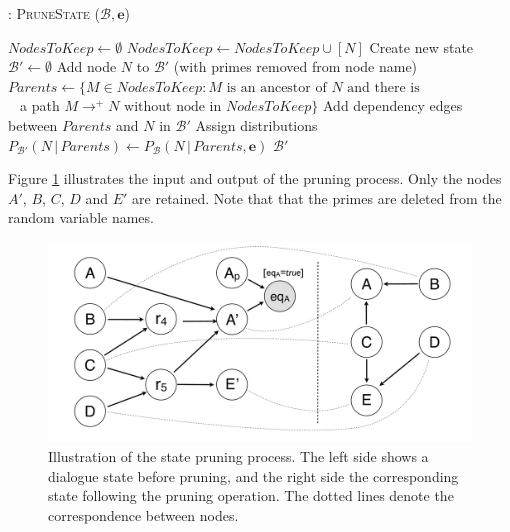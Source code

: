 \begin{algorithm}[h]
\caption{: \textsc{PruneState} ($\mathcal{B}, \mathbf{e}$)}
\begin{algorithmic}[1] \vspace{1mm}
\STATE $\mathit{NodesToKeep} \leftarrow \emptyset$
\STATE $\mathit{NodesToKeep} \leftarrow \mathit{NodesToKeep} \cup [N]$ 
\ENDIF
\ENDFOR
\STATE Create new state $\mathcal{B'} \leftarrow \emptyset$
\STATE Add node $N$ to $\mathcal{B'}$ (with primes removed from node name)
\STATE $\mathit{Parents} \leftarrow \{M \in \mathit{NodesToKeep} : M \text{ is an ancestor of } N \text{ and there is } $ \\ $\phantom{a}$  \; \; \; \; \; \; \; \; \;  a path $M \rightarrow^+  N \text{ without node in } \mathit{NodesToKeep} \}$ 
\STATE Add dependency edges between $\mathit{Parents}$ and $N$ in $\mathcal{B}'$
\STATE Assign distributions $P_{\mathcal{B}'}(N \, | \, \mathit{Parents}) \leftarrow P_{\mathcal{B}}(N \, | \, \mathit{Parents}, \mathbf{e})$
\ENDFOR
\RETURN $\mathcal{B}'$
\end{algorithmic}
\label{algo:pruneState}
\end{algorithm}


Figure \ref{fig:pruning} illustrates the input and output of the pruning process.  Only the nodes $A'$, $B$, $C$, $D$ and $E'$ are retained. Note that that the primes are deleted from the random variable names.

\begin{figure}[h]
\centering
\includegraphics[scale=0.20]{imgs/pruning.pdf}
\caption{Illustration of the state pruning process. The left side shows a dialogue state before pruning, and the right side the corresponding state following the pruning operation. The dotted lines denote the correspondence between nodes.}
\label{fig:pruning}
\end{figure}


